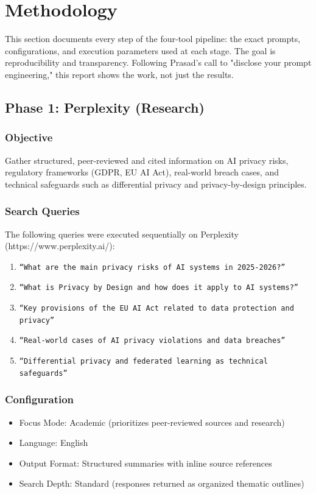 \section{Methodology}

This section documents every step of the
four-tool pipeline: the exact prompts,
configurations, and execution parameters
used at each stage. The goal is
reproducibility and transparency.
Following Prasad's call to "disclose your
prompt engineering," this report shows the
work, not just the results.

\subsection{Phase 1: Perplexity (Research)}

\subsubsection{Objective}
Gather structured, peer-reviewed and
cited information on AI privacy risks,
regulatory frameworks (GDPR, EU AI Act),
real-world breach cases, and technical
safeguards such as differential privacy
and privacy-by-design principles.

\subsubsection{Search Queries}
The following queries were executed
sequentially on Perplexity
(https://www.perplexity.ai/):

\begin{enumerate}
    \item \texttt{``What are the main
    privacy risks of AI systems in
    2025-2026?''}
    \item \texttt{``What is Privacy by
    Design and how does it apply to AI
    systems?''}
    \item \texttt{``Key provisions of the
    EU AI Act related to data protection
    and privacy''}
    \item \texttt{``Real-world cases of AI
    privacy violations and data
    breaches''}
    \item \texttt{``Differential privacy
    and federated learning as technical
    safeguards''}
\end{enumerate}

\subsubsection{Configuration}
\begin{itemize}
    \item Focus Mode: Academic
    (prioritizes peer-reviewed sources
    and research)
    \item Language: English
    \item Output Format: Structured
    summaries with inline source
    references
    \item Search Depth: Standard
    (responses returned as organized
    thematic outlines)
\end{itemize}


